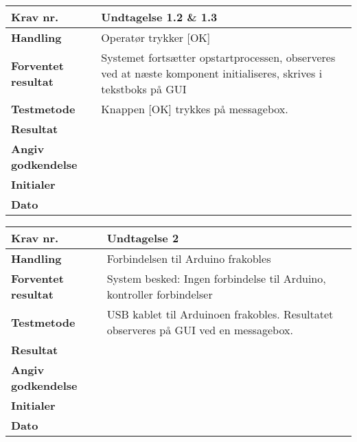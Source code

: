 	\begin{center}
		\begin{longtable}{ | m{4cm}| m{8.5cm}|} 
			\hline
			\textbf{Krav nr.} & Undtagelse 1.2 \& 1.3   \\ 
			\hline
			\textbf{Handling} & Operatør trykker [OK]  \\
			\hline
			\textbf{Forventet resultat} & Systemet fortsætter opstartprocessen, observeres ved at næste komponent initialiseres, skrives i tekstboks på GUI \\
			\hline
			\textbf{Testmetode}  & Knappen [OK] trykkes på messagebox.   \\
			\hline
			\textbf{Resultat}  &    \\
			\hline
			\textbf{Angiv godkendelse} &     \\
			\hline
			\textbf{Initialer} &     \\
			\hline
			\textbf{Dato} &    \\
			\hline
		\end{longtable}
	\end{center}	

	\begin{center}
		\begin{longtable}{ | m{4cm}| m{8.5cm}|} 
			\hline
			\textbf{Krav nr.} & Undtagelse 2   \\ 
			\hline
			\textbf{Handling} & Forbindelsen til Arduino frakobles  \\
			\hline
			\textbf{Forventet resultat} & System besked:  Ingen forbindelse til Arduino, kontroller forbindelser \\
			\hline
			\textbf{Testmetode}  & USB kablet til Arduinoen frakobles. Resultatet observeres på GUI ved en messagebox.   \\
			\hline
			\textbf{Resultat}  &    \\
			\hline
			\textbf{Angiv godkendelse} &     \\
			\hline
			\textbf{Initialer} &     \\
			\hline
			\textbf{Dato} &    \\
			\hline
		\end{longtable}
	\end{center}
	

